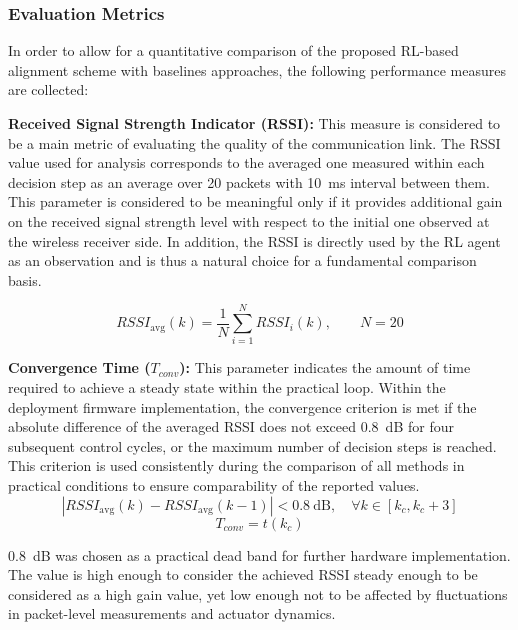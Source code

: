 \subsubsection{Evaluation Metrics}

In order to allow for a quantitative comparison of the proposed RL-based alignment scheme with
baselines approaches, the following performance measures are collected:

\textbf{Received Signal Strength Indicator (RSSI):} 
This measure is considered to be a main metric of evaluating the quality of the communication
link. The RSSI value used for analysis corresponds to the averaged one measured within
each decision step as an average over 20 packets with 10~ms interval between them. 
This parameter is considered to be meaningful only if it provides additional gain on
the received signal strength level with respect to the initial one observed at the
wireless receiver side. In addition, the RSSI is directly used by the RL agent as an
observation and is thus a natural choice for a fundamental comparison basis.

\begin{equation}
RSSI_{\text{avg}}(k) = \frac{1}{N}\sum_{i=1}^{N} RSSI_i(k), \qquad N = 20
\end{equation}

\textbf{Convergence Time ($T_{conv}$):} 
This parameter indicates the amount of time required to achieve a steady state within the practical
loop. Within the deployment firmware implementation, the convergence criterion is met if the absolute
difference of the averaged RSSI does not exceed 0.8~dB for four subsequent control cycles, or the maximum
number of decision steps is reached. This criterion is used consistently during the comparison of all methods
in practical conditions to ensure comparability of the reported values.
\begin{equation}
\left| RSSI_{\text{avg}}(k) - RSSI_{\text{avg}}(k-1) \right| < 0.8~\text{dB},
\quad \forall k \in [k_c, k_c+3]
\end{equation}
\begin{equation}
T_{conv} = t(k_c)
\end{equation}

0.8~dB was chosen as a practical dead band for further hardware implementation. The value is high enough to
consider the achieved RSSI steady enough to be considered as a high gain value, yet low enough not to be
affected by fluctuations in packet-level measurements and actuator dynamics.

